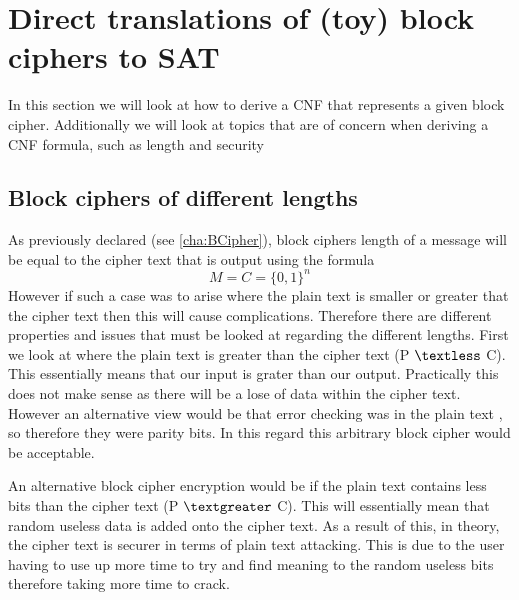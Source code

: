 \documentclass[11pt,a4paper]{report}
\begin{document}
\chapter{Direct translations of (toy) block ciphers to SAT}
\label{cha:dirtrans}
In this section we will look at how to derive a CNF that represents a given block cipher. Additionally we will look at topics that are of concern when deriving a CNF formula, such as length and security

\section{Block ciphers of different lengths}
As previously declared (see \ref{cha:BCipher}), block ciphers length of a message will be equal to the cipher text that is output using the formula 
\begin{displaymath}
 M = C = \{0,1\}^{n}
\end{displaymath}
However if such a case was to arise where the plain text is smaller or greater that the cipher text then this will cause complications. Therefore there are different properties and issues that must be looked at regarding the different lengths. First we look at where the plain text is greater than the cipher text (P $\textless$ C). This essentially means that our input is grater than our output. Practically this does not make sense as there will be a lose of data within the cipher text.  However an alternative view would be that error checking was in the plain text , so therefore they were parity bits. In this regard this arbitrary block cipher would be acceptable.

An alternative block cipher encryption would be if the plain text contains less bits than the cipher text (P $\textgreater$ C). This will essentially mean that random useless data is added onto the cipher text. As a result of this, in theory, the cipher text is securer in terms of plain text attacking. This is due to the user having to use up more time to try and find meaning to the random useless bits therefore taking more time to crack.
\end{document}
